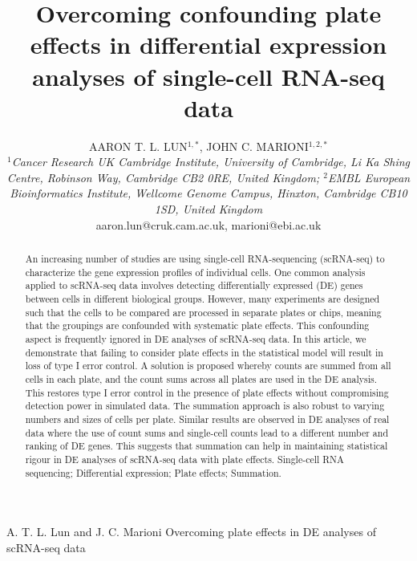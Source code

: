 \documentclass[oupdraft]{bio}
\begin{document}
\title{Overcoming confounding plate effects in differential expression analyses of single-cell RNA-seq data}

\author{AARON T. L. LUN$^{1,\ast}$, JOHN C. MARIONI$^{1,2,\ast}$ \\[4pt]
    \textit{$^1$Cancer Research UK Cambridge Institute, University of Cambridge, Li Ka Shing Centre, Robinson Way, Cambridge CB2 0RE, United Kingdom;
$^2$EMBL European Bioinformatics Institute, Wellcome Genome Campus, Hinxton, Cambridge CB10 1SD, United Kingdom}
    \\[2pt]
{aaron.lun@cruk.cam.ac.uk, marioni@ebi.ac.uk}}

\markboth%
{A. T. L. Lun and J. C. Marioni}
{Overcoming plate effects in DE analyses of scRNA-seq data}

\maketitle


\begin{abstract}{
An increasing number of studies are using single-cell RNA-sequencing (scRNA-seq) to characterize the gene expression profiles of individual cells.
One common analysis applied to scRNA-seq data involves detecting differentially expressed (DE) genes between cells in different biological groups.
However, many experiments are designed such that the cells to be compared are processed in separate plates or chips, 
    meaning that the groupings are confounded with systematic plate effects.
This confounding aspect is frequently ignored in DE analyses of scRNA-seq data.
In this article, we demonstrate that failing to consider plate effects in the statistical model will result in loss of type I error control.
A solution is proposed whereby counts are summed from all cells in each plate, and the count sums across all plates are used in the DE analysis.
This restores type I error control in the presence of plate effects without compromising detection power in simulated data.
The summation approach is also robust to varying numbers and sizes of cells per plate.
Similar results are observed in DE analyses of real data where the use of count sums and single-cell counts lead to a different number and ranking of DE genes.
This suggests that summation can help in maintaining statistical rigour in DE analyses of scRNA-seq data with plate effects.
}
{Single-cell RNA sequencing; Differential expression; Plate effects; Summation.}
\end{abstract}
\end{document}

